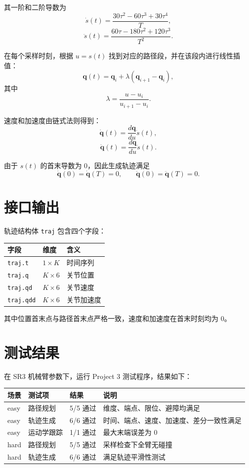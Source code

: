 \documentclass[UTF8,a4paper,12pt]{ctexart}
\begin{document}
其一阶和二阶导数为
\[
    \dot{s}(t)
    =
    \frac{30\tau^2-60\tau^3+30\tau^4}{T},
\]
\[
    \ddot{s}(t)
    =
    \frac{60\tau-180\tau^2+120\tau^3}{T^2}.
\]

在每个采样时刻，根据 $u=s(t)$ 找到对应的路径段，并在该段内进行线性插值：
\[
    \mathbf{q}(t)
    =
    \mathbf{q}_i
    +
    \lambda
    (\mathbf{q}_{i+1}-\mathbf{q}_i),
\]
其中
\[
    \lambda = \frac{u-u_i}{u_{i+1}-u_i}.
\]

速度和加速度由链式法则得到：
\[
    \dot{\mathbf{q}}(t)
    =
    \frac{d\mathbf{q}}{du}\dot{s}(t),
\]
\[
    \ddot{\mathbf{q}}(t)
    =
    \frac{d\mathbf{q}}{du}\ddot{s}(t).
\]

由于 $s(t)$ 的首末导数为 0，因此生成轨迹满足
\[
    \dot{\mathbf{q}}(0)=\dot{\mathbf{q}}(T)=0,
    \qquad
    \ddot{\mathbf{q}}(0)=\ddot{\mathbf{q}}(T)=0.
\]

\section{接口输出}

轨迹结构体 \texttt{traj} 包含四个字段：

\begin{table}[h]
\centering
\begin{tabular}{lll}
\toprule
字段 & 维度 & 含义 \\
\midrule
\texttt{traj.t} & $1 \times K$ & 时间序列 \\
\texttt{traj.q} & $K \times 6$ & 关节位置 \\
\texttt{traj.qd} & $K \times 6$ & 关节速度 \\
\texttt{traj.qdd} & $K \times 6$ & 关节加速度 \\
\bottomrule
\end{tabular}
\end{table}

其中位置首末点与路径首末点严格一致，速度和加速度在首末时刻均为 0。

\section{测试结果}

在 SR3 机械臂参数下，运行 Project 3 测试程序，结果如下：

\begin{table}[h]
\centering
\begin{tabular}{llll}
\toprule
场景 & 测试项 & 结果 & 说明 \\
\midrule
easy & 路径规划 & 5/5 通过 & 维度、端点、限位、避障均满足 \\
easy & 轨迹生成 & 6/6 通过 & 时间、端点、速度、加速度、差分一致性满足 \\
easy & 运动学跟踪 & 1/1 通过 & 最大末端误差为 0 \\
hard & 路径规划 & 5/5 通过 & 采样检查下全臂无碰撞 \\
hard & 轨迹生成 & 6/6 通过 & 满足轨迹平滑性测试 \\
\bottomrule
\end{tabular}
\end{table}
\end{document}

